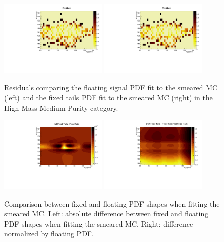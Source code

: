 \begin{figure}[h]
  \centering
  \includegraphics[trim={0 0 0 0.99cm},clip,width=0.45\textwidth]{figures/sec-systematics/HMMPC_up_tails_notfixed_central_res.pdf}\hfil
  \includegraphics[trim={0 0 0 0.99cm},clip,width=0.45\textwidth]{figures/sec-systematics/HMMPC_up_tails_fixed_central_res.pdf}\hfil
  \caption{Residuals comparing the floating signal PDF fit to the smeared MC (left) and the fixed tails PDF fit to the smeared MC (right) in the High Mass-Medium Purity category.}
  \label{fig:res_smear}
\end{figure}

\begin{figure}[h]
  \centering
  \includegraphics[width=0.45\textwidth]{figures/sec-systematics/fixnfix.pdf}\hfil
  \includegraphics[width=0.45\textwidth]{figures/sec-systematics/fixnfixE.pdf}\hfil
  \caption{Comparison between fixed and floating PDF shapes when fitting the smeared MC. Left: absolute difference between fixed and floating PDF shapes when fitting the smeared MC. Right: difference normalized by floating PDF. }
  \label{fig:comp_smear}
\end{figure}

